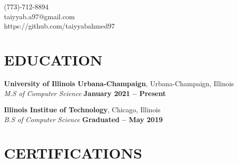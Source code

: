 \documentclass[margin,line]{resume}
\begin{document}
{
    \hfill (773)-712-8894       \vspace{0mm}\\\vspace{0mm}%
    \hfill taiyyab.a97@gmail.com           \vspace{0mm}\\\vspace{0mm}%
    \hfill https://github.com/taiyyabahmed97 \vspace{0mm}\\\vspace{-9mm}%
}

\begin{resume}

    \vspace{-3mm}


    \vspace{-1mm}



    \section{\mysidestyle \textbf{\large{E}\small{DUCATION}}}

    \textbf{\listing University of Illinois Urbana-Champaign}, Urbana-Champaign, Illinois \vspace{1mm}\\
    \textsl{M.S of Computer Science} \hfill \textbf{January 2021 -- Present}\vspace{-3mm}\\\vspace{-1mm}%

    \textbf{\listing Illinois Institue of Technology}, Chicago, Illinois \vspace{1mm}\\
    \textsl{B.S of Computer Science}  \hfill \textbf{Graduated -- May 2019}\vspace{-3mm}\\\vspace{-1mm}%

    \vspace{-1mm}

    \section{\mysidestyle \textbf{\large{C}\small{ERTIFICATIONS}}}


\end{resume}
\end{document}
